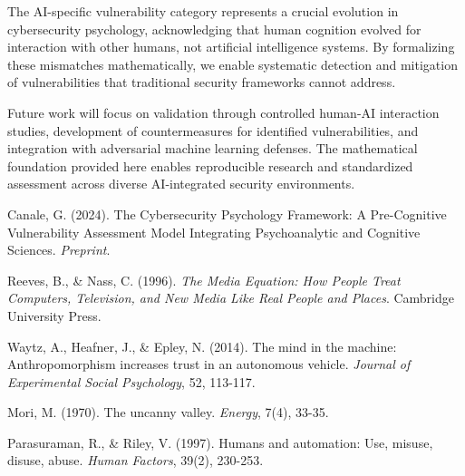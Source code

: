 \documentclass[11pt,a4paper]{article}
\begin{document}
The AI-specific vulnerability category represents a crucial evolution in cybersecurity psychology, acknowledging that human cognition evolved for interaction with other humans, not artificial intelligence systems. By formalizing these mismatches mathematically, we enable systematic detection and mitigation of vulnerabilities that traditional security frameworks cannot address.

Future work will focus on validation through controlled human-AI interaction studies, development of countermeasures for identified vulnerabilities, and integration with adversarial machine learning defenses. The mathematical foundation provided here enables reproducible research and standardized assessment across diverse AI-integrated security environments.

\begin{thebibliography}{9}

Canale, G. (2024). The Cybersecurity Psychology Framework: A Pre-Cognitive Vulnerability Assessment Model Integrating Psychoanalytic and Cognitive Sciences. \textit{Preprint}.

Reeves, B., \& Nass, C. (1996). \textit{The Media Equation: How People Treat Computers, Television, and New Media Like Real People and Places}. Cambridge University Press.

Waytz, A., Heafner, J., \& Epley, N. (2014). The mind in the machine: Anthropomorphism increases trust in an autonomous vehicle. \textit{Journal of Experimental Social Psychology}, 52, 113-117.

Mori, M. (1970). The uncanny valley. \textit{Energy}, 7(4), 33-35.

Parasuraman, R., \& Riley, V. (1997). Humans and automation: Use, misuse, disuse, abuse. \textit{Human Factors}, 39(2), 230-253.

\end{thebibliography}
\end{document}
